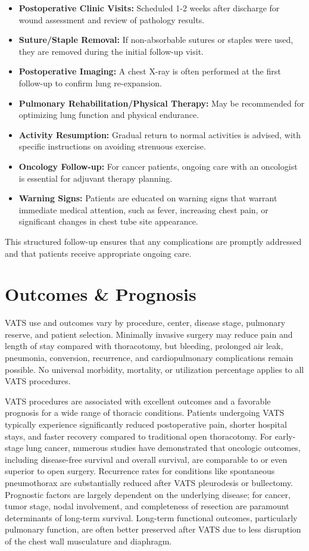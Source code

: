 \begin{itemize}
  \item \textbf{Postoperative Clinic Visits:} Scheduled 1-2 weeks after discharge for wound assessment and review of pathology results.
  \item \textbf{Suture/Staple Removal:} If non-absorbable sutures or staples were used, they are removed during the initial follow-up visit.
  \item \textbf{Postoperative Imaging:} A chest X-ray is often performed at the first follow-up to confirm lung re-expansion.
  \item \textbf{Pulmonary Rehabilitation/Physical Therapy:} May be recommended for optimizing lung function and physical endurance.
  \item \textbf{Activity Resumption:} Gradual return to normal activities is advised, with specific instructions on avoiding strenuous exercise.
  \item \textbf{Oncology Follow-up:} For cancer patients, ongoing care with an oncologist is essential for adjuvant therapy planning.
  \item \textbf{Warning Signs:} Patients are educated on warning signs that warrant immediate medical attention, such as fever, increasing chest pain, or significant changes in chest tube site appearance.
\end{itemize}

This structured follow-up ensures that any complications are promptly addressed and that patients receive appropriate ongoing care.

\section*{Outcomes \& Prognosis}
VATS use and outcomes vary by procedure, center, disease stage, pulmonary reserve, and patient selection. Minimally invasive surgery may reduce pain and length of stay compared with thoracotomy, but bleeding, prolonged air leak, pneumonia, conversion, recurrence, and cardiopulmonary complications remain possible. No universal morbidity, mortality, or utilization percentage applies to all VATS procedures.

VATS procedures are associated with excellent outcomes and a favorable prognosis for a wide range of thoracic conditions. Patients undergoing VATS typically experience significantly reduced postoperative pain, shorter hospital stays, and faster recovery compared to traditional open thoracotomy. For early-stage lung cancer, numerous studies have demonstrated that oncologic outcomes, including disease-free survival and overall survival, are comparable to or even superior to open surgery. Recurrence rates for conditions like spontaneous pneumothorax are substantially reduced after VATS pleurodesis or bullectomy. Prognostic factors are largely dependent on the underlying disease; for cancer, tumor stage, nodal involvement, and completeness of resection are paramount determinants of long-term survival. Long-term functional outcomes, particularly pulmonary function, are often better preserved after VATS due to less disruption of the chest wall musculature and diaphragm.

